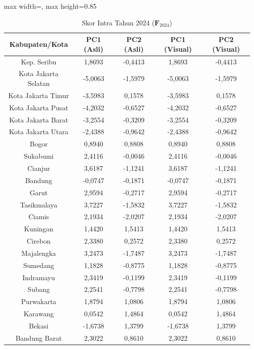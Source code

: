 \begin{table}[H]
\centering
\caption{Skor Intra Tahun 2024 ($\mathbf{F}_{2024}$)} \label{tab:app2skor_intra_2024}
\begin{adjustbox}{max width=\textwidth, max height=0.85\textheight}
\begin{tabular}{|c|c|c|c|c|}
\hline
\textbf{Kabupaten/Kota} & \textbf{PC1 (Asli)} & \textbf{PC2 (Asli)} & \textbf{PC1 (Visual)} & \textbf{PC2 (Visual)} \\
\hline
Kep. Seribu & 1,8693 & -0,4413 & 1,8693 & -0,4413 \\
Kota Jakarta Selatan & -5,0063 & -1,5979 & -5,0063 & -1,5979 \\
Kota Jakarta Timur & -3,5983 & 0,1578 & -3,5983 & 0,1578 \\
Kota Jakarta Pusat & -4,2032 & -0,6527 & -4,2032 & -0,6527 \\
Kota Jakarta Barat & -3,2554 & -0,3209 & -3,2554 & -0,3209 \\
Kota Jakarta Utara & -2,4388 & -0,9642 & -2,4388 & -0,9642 \\
Bogor & 0,8940 & 0,8808 & 0,8940 & 0,8808 \\
Sukabumi & 2,4116 & -0,0046 & 2,4116 & -0,0046 \\
Cianjur & 3,6187 & -1,1241 & 3,6187 & -1,1241 \\
Bandung & -0,0747 & -0,1871 & -0,0747 & -0,1871 \\
Garut & 2,9594 & -0,2717 & 2,9594 & -0,2717 \\
Tasikmalaya & 3,7227 & -1,5832 & 3,7227 & -1,5832 \\
Ciamis & 2,1934 & -2,0207 & 2,1934 & -2,0207 \\
Kuningan & 1,4420 & 1,5413 & 1,4420 & 1,5413 \\
Cirebon & 2,3380 & 0,2572 & 2,3380 & 0,2572 \\
Majalengka & 3,2473 & -1,7487 & 3,2473 & -1,7487 \\
Sumedang & 1,1828 & -0,8775 & 1,1828 & -0,8775 \\
Indramayu & 2,3419 & -0,1199 & 2,3419 & -0,1199 \\
Subang & 2,2541 & -0,7798 & 2,2541 & -0,7798 \\
Purwakarta & 1,8794 & 1,0806 & 1,8794 & 1,0806 \\
Karawang & 0,0542 & 1,4864 & 0,0542 & 1,4864 \\
Bekasi & -1,6738 & 1,3799 & -1,6738 & 1,3799 \\
Bandung Barat & 2,3022 & 0,8610 & 2,3022 & 0,8610 \\

\end{tabular}
\end{adjustbox}
\end{table}

